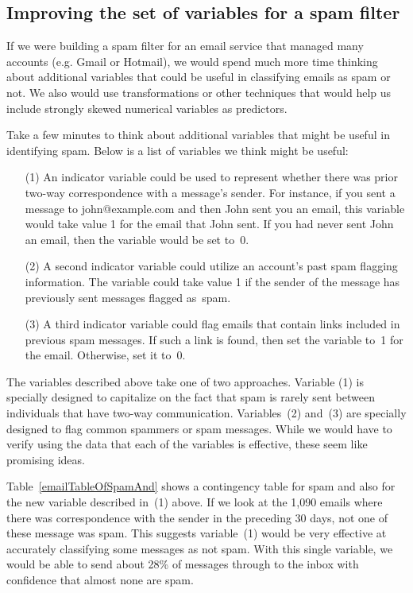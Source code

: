 \subsection{Improving the set of variables for a spam filter}
\label{improvingTheSetOfVariablesForASpamFilter}

If we were building a spam filter for an email service that managed many accounts (e.g. Gmail or Hotmail), we would spend much more time thinking about additional variables that could be useful in classifying emails as spam or not. We also would use transformations or other techniques that would help us include strongly skewed numerical variables as predictors.

Take a few minutes to think about additional variables that might be useful in identifying spam. Below is a list of variables we think might be useful:
\begin{enumerate}
\item[(1)] An indicator variable could be used to represent whether there was prior two-way correspondence with a message's sender. For instance, if you sent a message to john@example.com and then John sent you an email, this variable would take value 1 for the email that John sent. If you had never sent John an email, then the variable would be set to~0.
\item[(2)] A second indicator variable could utilize an account's past spam flagging information. The variable could take value 1 if the sender of the message has previously sent messages flagged as~spam.
\item[(3)] A third indicator variable could flag emails that contain links included in previous spam messages. If such a link is found, then set the variable to~1 for the email. Otherwise, set it to~0.
\end{enumerate}
The variables described above take one of two approaches. Variable (1) is specially designed to capitalize on the fact that spam is rarely sent between individuals that have two-way communication. Variables~(2) and~(3) are specially designed to flag common spammers or spam messages. While we would have to verify using the data that each of the variables is effective, these seem like promising ideas.

Table~\ref{emailTableOfSpamAnd} shows a contingency table for spam and also for the new variable described in~(1) above. If we look at the 1,090 emails where there was correspondence with the sender in the preceding 30 days, not one of these message was spam. This suggests variable~(1) would be very effective at accurately classifying some messages as not spam. With this single variable, we would be able to send about 28\% of messages through to the inbox with confidence that almost none are spam.


